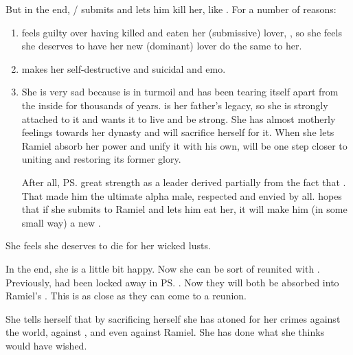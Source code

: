 \begin{garbage}
But in the end, \Shiaraid/\Belzir{} submits and lets him kill her, like . 
For a number of reasons:
\begin{enumerate}
  \item 
    \Shiaraid{} feels guilty over having killed and eaten her (submissive) lover, \Eryal, so she feels she deserves to have her new (dominant) lover do the same to her. 
  \item 
    \NexagglachelsCurse{} makes her self-destructive and suicidal and emo. 
  \item 
    She is very sad because \Mystraacht{} is in turmoil and has been tearing itself apart from the inside for thousands of years. 
    \Mystraacht{} is her father's legacy, so she is strongly attached to it and wants it to live and be strong. 
    She has almost motherly feelings towards her dynasty and will sacrifice herself for it.
    When she lets Ramiel absorb her power and unify it with his own, \Mystraacht{} will be one step closer to uniting and restoring its former glory. 
    
    After all, \ps{\Zachirah} great strength as a leader derived partially from the fact that . 
    That made him the ultimate alpha male, respected and envied by all. 
    \Shiaraid{} hopes that if she submits to Ramiel and lets him eat her, it will make him (in some small way) a new \Zachirah. 
\end{enumerate}

She feels she deserves to die for her wicked \sathariah{} lusts.


In the end, she is a little bit happy. 
Now she can be sort of reunited with . 
Previously, \Eryal{} had been locked away in \ps{\Shiaraid} \carcer. 
Now they will both be absorbed into Ramiel's \carcer. 
This is as close as they can come to a reunion. 

She tells herself that by sacrificing herself she has atoned for her crimes against the world, against \Eryal, and even against Ramiel. 
She has done what she thinks \Eryal{} would have wished. 


\end{garbage}
